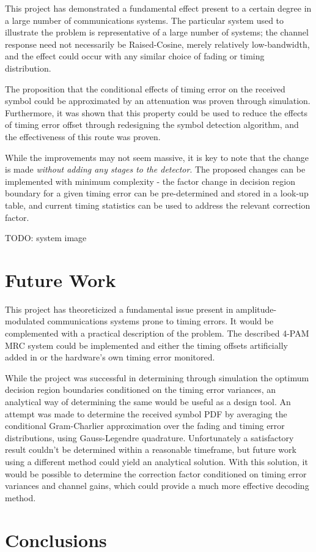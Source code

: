 This project has demonstrated a fundamental effect present to a certain degree in a large number of communications systems. The particular system used to illustrate the problem is representative of a large number of systems; the channel response need not necessarily be Raised-Cosine, merely relatively low-bandwidth, and the effect could occur with any similar choice of fading or timing distribution.

The proposition that the conditional effects of timing error on the received symbol could be approximated by an attenuation was proven through simulation. Furthermore, it was shown that this property could be used to reduce the effects of timing error offset through redesigning the symbol detection algorithm, and the effectiveness of this route was proven.

While the improvements may not seem massive, it is key to note that the change is made \emph{without adding any stages to the detector}. The proposed changes can be implemented with minimum complexity - the factor change in decision region boundary for a given timing error can be pre-determined and stored in a look-up table,  and current timing statistics can be used to address the relevant correction factor.

TODO: system image

\chapter{Future Work}

This project has theoreticized a fundamental issue present in amplitude-modulated communications systems prone to timing errors. It would be complemented with a practical description of the problem. The described 4-PAM MRC system could be implemented and either the timing offsets artificially added in or the hardware's own timing error monitored.

While the project was successful in determining through simulation the optimum decision region boundaries conditioned on the timing error variances, an analytical way of determining the same would be useful as a design tool. An attempt was made to determine the received symbol PDF by averaging the conditional Gram-Charlier approximation over the fading and timing error distributions, using Gauss-Legendre quadrature. Unfortunately a satisfactory result couldn't be determined within a reasonable timeframe, but future work using a different method could yield an analytical solution. With this solution, it would be possible to determine the correction factor conditioned on timing error variances and channel gains, which could provide a much more effective decoding method.

\chapter{Conclusions}





